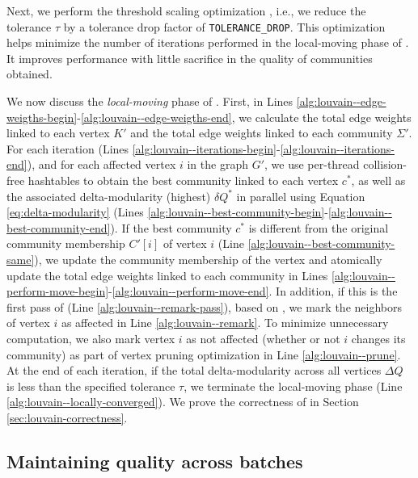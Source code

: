 Next, we perform the threshold scaling optimization \cite{com-naim17}, i.e., we reduce the tolerance $\tau$ by a tolerance drop factor of \verb|TOLERANCE_DROP|. This optimization helps minimize the number of iterations performed in the local-moving phase of \Lou{}. It improves performance with little sacrifice in the quality of communities obtained.

We now discuss the \textit{local-moving} phase of \Lou{}. First, in Lines \ref{alg:louvain--edge-weigths-begin}-\ref{alg:louvain--edge-weigths-end}, we calculate the total edge weights linked to each vertex $K'$ and the total edge weights linked to each community $\Sigma'$. For each iteration (Lines \ref{alg:louvain--iterations-begin}-\ref{alg:louvain--iterations-end}), and for each affected vertex $i$ in the graph $G'$, we use per-thread collision-free hashtables to obtain the best community linked to each vertex $c^*$, as well as the associated delta-modularity (highest) $\delta Q^*$ in parallel using Equation \ref{eq:delta-modularity} (Lines \ref{alg:louvain--best-community-begin}-\ref{alg:louvain--best-community-end}). If the best community $c^*$ is different from the original community membership $C'[i]$ of vertex $i$ (Line \ref{alg:louvain--best-community-same}), we update the community membership of the vertex and atomically update the total edge weights linked to each community in Lines \ref{alg:louvain--perform-move-begin}-\ref{alg:louvain--perform-move-end}. In addition, if this is the first pass of \Lou{} (Line \ref{alg:louvain--remark-pass}), based on \Fro{}, we mark the neighbors of vertex $i$ as affected in Line \ref{alg:louvain--remark}. To minimize unnecessary computation, we also mark vertex $i$ as not affected (whether or not $i$ changes its community) as part of vertex pruning optimization in Line \ref{alg:louvain--prune}. At the end of each iteration, if the total delta-modularity across all vertices $\Delta Q$ is less than the specified tolerance $\tau$, we terminate the local-moving phase (Line \ref{alg:louvain--locally-converged}). We prove the correctness of \FroLou{} in Section \ref{sec:louvain-correctness}.




\subsection{Maintaining quality across batches}
\label{sec:restart}

